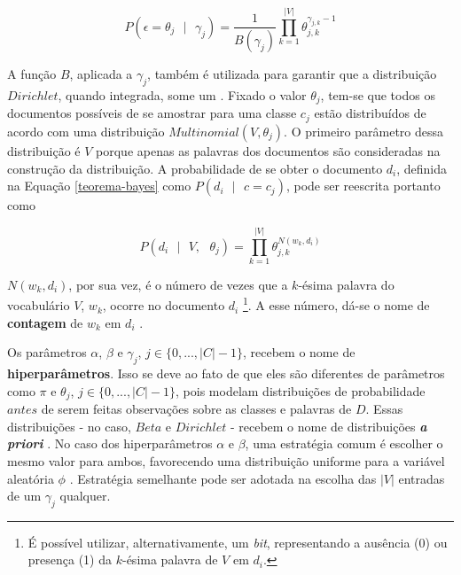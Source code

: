 \begin{equation}
\label{dirichlet}
  \ensuremath{P(\epsilon = \theta_j\mbox{ } |\mbox{ } \gamma_j) = \frac{1}{B(\gamma_j)}\prod_{k = 1}^{|V|}\theta_{j,k}^{\gamma_{j,k} - 1}}
\end{equation}

A função \ensuremath{B}, aplicada a \ensuremath{\gamma_j}, também é utilizada para garantir que a distribuição \ensuremath{Dirichlet}, quando integrada, some um \cite{stat-distribs}. Fixado o valor \ensuremath{\theta_j}, tem-se que todos os documentos possíveis de se amostrar para uma classe \ensuremath{c_j} estão distribuídos de acordo com uma distribuição \ensuremath{Multinomial(V, \theta_j)}. O primeiro parâmetro dessa distribuição é \ensuremath{V} porque apenas as palavras dos documentos são consideradas na construção da distribuição. A probabilidade de se obter o documento \ensuremath{d_i}, definida na Equação \ref{teorema-bayes} como \ensuremath{P(d_i\mbox{ }|\mbox{ }c = c_j)}, pode ser reescrita portanto como \cite{resnik}

\begin{equation}
\label{multinomial}
\ensuremath{P(d_i\mbox{ } |\mbox{ } V,\mbox{ } \theta_j)  = \prod_{k = 1}^{|V|}\theta_{j,k}^{N(w_k, d_i)}}
\end{equation}

\ensuremath{N(w_k, d_i)}, por sua vez, é o número de vezes que a \ensuremath{k}-ésima palavra do vocabulário \ensuremath{V}, \ensuremath{w_k}, ocorre no documento \ensuremath{d_i} \cite{resnik}\footnote{É possível utilizar, alternativamente, um \emph{bit}, representando a ausência (0) ou presença (1) da \ensuremath{k}-ésima palavra de \ensuremath{V} em \ensuremath{d_i}.}. A esse número, dá-se o nome de \textbf{contagem} de \ensuremath{w_k} em \ensuremath{d_i} \cite{nigam}. 

Os parâmetros \ensuremath{\alpha}, \ensuremath{\beta} e \ensuremath{\gamma_j}, \ensuremath{j \in \{0, ..., |C| - 1\}}, recebem o nome de \textbf{hiperparâmetros}. Isso se deve ao fato de que eles são diferentes de parâmetros como \ensuremath{\pi} e \ensuremath{\theta_j}, \ensuremath{j \in \{0, ..., |C| - 1\}}, pois modelam distribuições de probabilidade \ensuremath{antes} de serem feitas observações sobre as classes e palavras de \ensuremath{D}. Essas distribuições - no caso, \ensuremath{Beta} e \ensuremath{Dirichlet} - recebem o nome de distribuições \textbf{\emph{a priori}} \cite{bishop}. No caso dos hiperparâmetros \ensuremath{\alpha} e \ensuremath{\beta}, uma estratégia comum é escolher o mesmo valor para ambos, favorecendo uma distribuição uniforme para a variável aleatória \ensuremath{\phi} \cite{nigam}. Estratégia semelhante pode ser adotada na escolha das \ensuremath{|V|} entradas de um \ensuremath{\gamma_j} qualquer.

